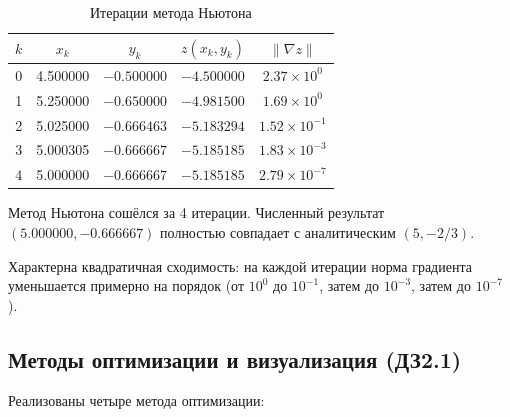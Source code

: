\begin{table}[H]
    \centering
    \caption{Итерации метода Ньютона}
    \label{tab:newton}
    \begin{tabular}{|c|c|c|c|c|}
        \hline
        \textbf{$k$} & \textbf{$x_k$} & \textbf{$y_k$} & \textbf{$z(x_k, y_k)$} & \textbf{$\|\nabla z\|$} \\
        \hline
        0 & 4.500000 & $-0.500000$ & $-4.500000$ & $2.37 \times 10^{0}$ \\
        1 & 5.250000 & $-0.650000$ & $-4.981500$ & $1.69 \times 10^{0}$ \\
        2 & 5.025000 & $-0.666463$ & $-5.183294$ & $1.52 \times 10^{-1}$ \\
        3 & 5.000305 & $-0.666667$ & $-5.185185$ & $1.83 \times 10^{-3}$ \\
        4 & 5.000000 & $-0.666667$ & $-5.185185$ & $2.79 \times 10^{-7}$ \\
        \hline
    \end{tabular}
\end{table}

Метод Ньютона сошёлся за 4 итерации. Численный результат $(5.000000, -0.666667)$ полностью совпадает с аналитическим $(5, -2/3)$.

Характерна квадратичная сходимость: на каждой итерации норма градиента уменьшается примерно на порядок (от $10^{0}$ до $10^{-1}$, затем до $10^{-3}$, затем до $10^{-7}$).

\subsection{Методы оптимизации и визуализация (ДЗ2.1)}

Реализованы четыре метода оптимизации:

